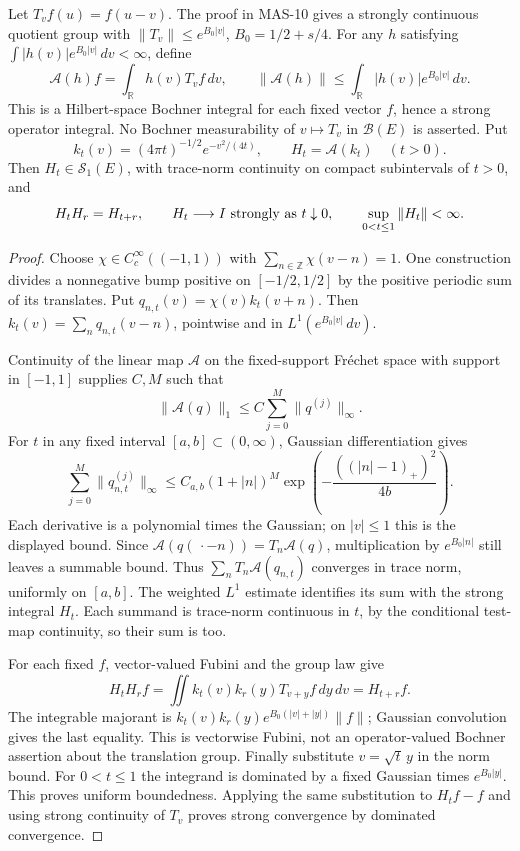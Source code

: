 \documentclass[11pt,a4paper]{article}
\newcommand{\R}{\mathbb R}
\newcommand{\Z}{\mathbb Z}
\newcommand{\fid}[1]{\textsf{#1}}
\begin{document}
Let $T_vf(u)=f(u-v)$. The proof in \fid{MAS-10} gives a strongly continuous quotient group with
$\|T_v\|\le e^{B_0|v|}$, $B_0=1/2+s/4$. For any $h$ satisfying
$\int|h(v)|e^{B_0|v|}\,dv<\infty$, define
\[
 \mathcal A(h)f=\int_\R h(v)T_vf\,dv,\qquad
 \|\mathcal A(h)\|\le\int_\R|h(v)|e^{B_0|v|}\,dv.
\]
This is a Hilbert-space Bochner integral for each fixed vector $f$, hence a strong operator integral. No Bochner measurability of $v\mapsto T_v$ in $\mathcal B(E)$ is asserted.
Put
\[
 k_t(v)=(4\pi t)^{-1/2}e^{-v^2/(4t)},\qquad H_t=\mathcal A(k_t)\quad(t>0).
\]
Then $H_t\in\mathcal S_1(E)$, with trace-norm continuity on compact subintervals of $t>0$, and
\[
 H_tH_r=H_{t+r},\qquad H_t\longrightarrow I\ \hbox{strongly as }t\downarrow0,
 \qquad \sup_{0<t\le1}\|H_t\|<\infty.
\]
\begin{proof}
Choose $\chi\in C_c^\infty((-1,1))$ with
$\sum_{n\in\Z}\chi(v-n)=1$. One construction divides a nonnegative bump positive on $[-1/2,1/2]$ by the positive periodic sum of its translates. Put
$q_{n,t}(v)=\chi(v)k_t(v+n)$. Then
$k_t(v)=\sum_n q_{n,t}(v-n)$, pointwise and in $L^1(e^{B_0|v|}\,dv)$.

Continuity of the linear map $\mathcal A$ on the fixed-support Fr\'echet space with support in $[-1,1]$ supplies $C,M$ such that
\[
 \|\mathcal A(q)\|_1\le C\sum_{j=0}^{M}\|q^{(j)}\|_\infty.
\]
For $t$ in any fixed interval $[a,b]\subset(0,\infty)$, Gaussian differentiation gives
\[
 \sum_{j=0}^{M}\|q_{n,t}^{(j)}\|_\infty
 \le C_{a,b}(1+|n|)^M
       \exp\!\left(-\frac{((|n|-1)_+)^2}{4b}\right).
\]
Each derivative is a polynomial times the Gaussian; on $|v|\le1$ this is the displayed bound. Since
$\mathcal A(q(\,\cdot-n))=T_n\mathcal A(q)$, multiplication by $e^{B_0|n|}$ still leaves a summable bound. Thus
$\sum_nT_n\mathcal A(q_{n,t})$ converges in trace norm, uniformly on $[a,b]$. The weighted $L^1$ estimate identifies its sum with the strong integral $H_t$. Each summand is trace-norm continuous in $t$, by the conditional test-map continuity, so their sum is too.

For each fixed $f$, vector-valued Fubini and the group law give
\[
 H_tH_rf=\iint k_t(v)k_r(y)T_{v+y}f\,dy\,dv=H_{t+r}f.
\]
The integrable majorant is
$k_t(v)k_r(y)e^{B_0(|v|+|y|)}\|f\|$; Gaussian convolution gives the last equality. This is vectorwise Fubini, not an operator-valued Bochner assertion about the translation group.
Finally substitute $v=\sqrt t\,y$ in the norm bound. For $0<t\le1$ the integrand is dominated by a fixed Gaussian times $e^{B_0|y|}$. This proves uniform boundedness. Applying the same substitution to
$H_tf-f$ and using strong continuity of $T_v$ proves strong convergence by dominated convergence.
\end{proof}
\end{document}
